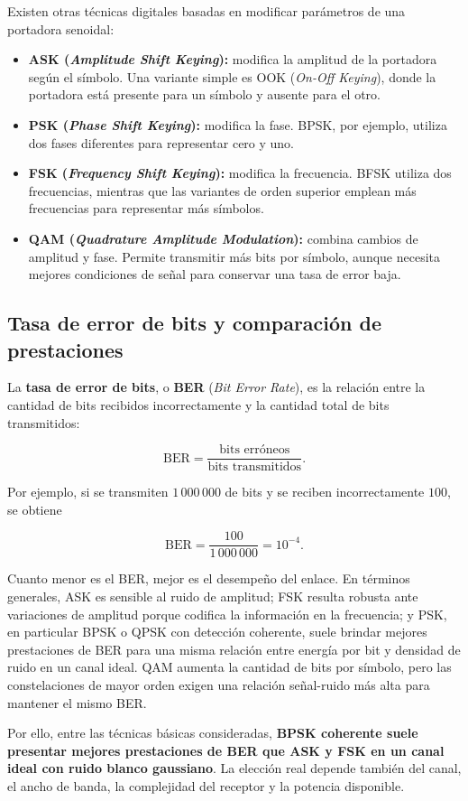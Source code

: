 ﻿\documentclass[12pt,a4paper]{article}
\begin{document}
Existen otras técnicas digitales basadas en modificar parámetros de una
portadora senoidal:

\begin{itemize}
  \item \textbf{ASK (\emph{Amplitude Shift Keying}):} modifica la amplitud de la
  portadora según el símbolo. Una variante simple es OOK (\emph{On-Off
  Keying}), donde la portadora está presente para un símbolo y ausente para el
  otro.

  \item \textbf{PSK (\emph{Phase Shift Keying}):} modifica la fase. BPSK, por
  ejemplo, utiliza dos fases diferentes para representar cero y uno.

  \item \textbf{FSK (\emph{Frequency Shift Keying}):} modifica la frecuencia.
  BFSK utiliza dos frecuencias, mientras que las variantes de orden superior
  emplean más frecuencias para representar más símbolos.

  \item \textbf{QAM (\emph{Quadrature Amplitude Modulation}):} combina cambios
  de amplitud y fase. Permite transmitir más bits por símbolo, aunque necesita
  mejores condiciones de señal para conservar una tasa de error baja.
\end{itemize}

\subsection{Tasa de error de bits y comparación de prestaciones}

La \textbf{tasa de error de bits}, o \textbf{BER} (\emph{Bit Error Rate}), es
la relación entre la cantidad de bits recibidos incorrectamente y la cantidad
total de bits transmitidos:

\[
\mathrm{BER}=\frac{\text{bits erróneos}}{\text{bits transmitidos}}.
\]

Por ejemplo, si se transmiten $1\,000\,000$ de bits y se reciben incorrectamente
$100$, se obtiene

\[
\mathrm{BER}=\frac{100}{1\,000\,000}=10^{-4}.
\]

Cuanto menor es el BER, mejor es el desempeño del enlace. En términos
generales, ASK es sensible al ruido de amplitud; FSK resulta robusta ante
variaciones de amplitud porque codifica la información en la frecuencia; y PSK,
en particular BPSK o QPSK con detección coherente, suele brindar mejores
prestaciones de BER para una misma relación entre energía por bit y densidad de
ruido en un canal ideal. QAM aumenta la cantidad de bits por símbolo, pero las
constelaciones de mayor orden exigen una relación señal-ruido más alta para
mantener el mismo BER.

Por ello, entre las técnicas básicas consideradas, \textbf{BPSK coherente suele
presentar mejores prestaciones de BER que ASK y FSK en un canal ideal con ruido
blanco gaussiano}. La elección real depende también del canal, el ancho de banda,
la complejidad del receptor y la potencia disponible.
\end{document}
